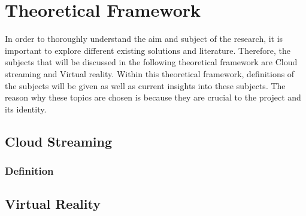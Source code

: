 \section{Theoretical Framework}

In order to thoroughly understand the aim and subject of the research, it is important to explore different existing solutions and literature. Therefore, the subjects that will be discussed in the  following theoretical framework are Cloud streaming and Virtual reality. Within this theoretical framework, definitions of the subjects will be given as well as current insights into these subjects. The reason why these topics are chosen is because they are crucial to the project and its identity.

\subsection{Cloud Streaming}
\subsubsection{Definition}

\subsection{Virtual Reality}